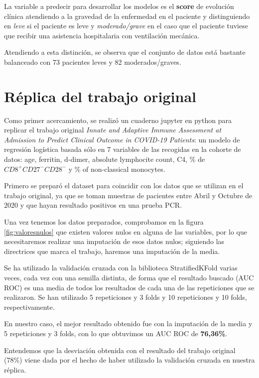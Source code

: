 La variable a predecir para desarrollar los modelos es el \textbf{score} de evolución clínica atendiendo a la gravedad de la enfermedad en el paciente y distinguiendo en \textit{leve} si el paciente es leve y \textit{moderado/grave} en el caso que el paciente tuviese que recibir una asistencia hospitalaria con ventilación mecánica.

Atendiendo a esta distinción, se observa que el conjunto de datos está bastante balanceado con 73 pacientes leves y 82 moderados/graves.

\section{Réplica del trabajo original}

Como primer acercamiento, se realizó un cuaderno jupyter en python para replicar el trabajo original \textit{Innate and Adaptive Immune Assessment at Admission to Predict Clinical Outcome in COVID-19 Patients}\cite{sansegundo:2021}: un modelo de regresión logística basada sólo en 7 variables de las recogidas en la cohorte de datos: age, ferritin, d-dimer, absolute lymphocite count, C4, \% de $CD8^{+}CD27^{-}CD28^{-}$ y \%  of non-classical monocytes.

Primero se preparó el dataset para coincidir con los datos que se utilizan en el trabajo original, ya que se toman muestras de pacientes entre Abril y Octubre de 2020 y que hayan resultado positivos en una prueba PCR.

Una vez tenemos los datos preparados, comprobamos en la figura \ref{fig:valoresnulos} que existen valores nulos en alguna de las variables, por lo que necesitaremos realizar una imputación de esos datos nulos; siguiendo las directrices que marca el trabajo, haremos una imputación de la media.


Se ha utilizado la validación cruzada con la biblioteca StratifiedKFold varias veces, cada vez con una semilla distinta, de forma que el resultado buscado (AUC ROC) es una media de todos los resultados de cada una de las repeticiones que se realizaron. Se han utilizado 5 repeticiones y 3 folds y 10 repeticiones y 10 folds, respectivamente.

En nuestro caso, el mejor resultado obtenido fue con la imputación de la media y 5 repeticiones y 3 folds, con lo que obtuvimos un AUC ROC de \textbf{76,36\%}.

Entendemos que la desviación obtenida con el resultado del trabajo original (78\%) viene dada por el hecho de haber utilizado la validación cruzada en nuestra réplica.

